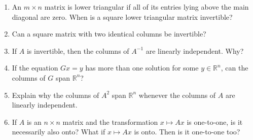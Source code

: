 \documentclass[12pt]{article}
\begin{document}
\begin{multicols*}{2}
\begin{enumerate}
		\item An $m\times n$ matrix is lower triangular if all of its entries lying above the main diagonal are zero. When is a square lower triangular matrix invertible?

		\vfill

		\item Can a square matrix with two identical columns be invertible?
		\vfill

		\item If $A$ is invertible, then the columns of $A^{-1}$ are linearly independent. Why?

		\vfill\null\columnbreak

		\item If the equation $Gx = y$ has more than one solution for some $y\in \mathbb{R}^n$, can the columns of $G$ span $\mathbb{R}^n$?
		\vfill

		\item Explain why the columns of $A^2$ span $\mathbb{R}^n$ whenever the columns of $A$ are linearly independent.
		\vfill

		\item If $A$ is an $n\times n$ matrix and the transformation $x\mapsto Ax$ is one-to-one, is it necessarily also onto? What if $x\mapsto Ax$ is onto. Then is it one-to-one too?

		\vfillb

	\end{enumerate}	
\end{multicols*}
\end{document}
